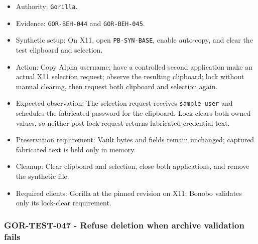 \documentclass[
  letterpaper,
]{article}
\newcommand{\passthrough}[1]{#1}
\providecommand{\tightlist}{%
  \setlength{\itemsep}{0pt}\setlength{\parskip}{0pt}}
\begin{document}
\begin{itemize}
\tightlist
\item
  Authority: \passthrough{\lstinline!Gorilla!}.
\item
  Evidence: \nolinkurl{GOR-BEH-044} and \nolinkurl{GOR-BEH-045}.
\item
  Synthetic setup: On X11, open \nolinkurl{PB-SYN-BASE}, enable auto-copy, and clear the test clipboard and selection.
\item
  Action: Copy Alpha username; have a controlled second application make an actual X11 selection request; observe the
  resulting clipboard; lock without manual clearing, then request both clipboard and selection again.
\item
  Expected observation: The selection request receives \nolinkurl{sample-user} and schedules the fabricated password for
  the clipboard. Lock clears both owned values, so neither post-lock request returns fabricated credential text.
\item
  Preservation requirement: Vault bytes and fields remain unchanged; captured fabricated text is held only in memory.
\item
  Cleanup: Clear clipboard and selection, close both applications, and remove the synthetic file.
\item
  Required clients: Gorilla at the pinned revision on X11; Bonobo validates only its lock-clear requirement.
\end{itemize}

\subsubsection{GOR-TEST-047 - Refuse deletion when archive validation
fails}\label{gor-test-047---refuse-deletion-when-archive-validation-fails}
\end{document}
